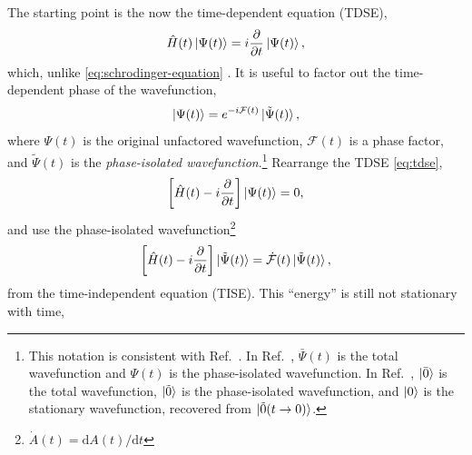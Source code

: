 \documentclass[%
class = book,%
crop = false,%
float = true,%
multi = true,%
preview = false,%
]{standalone}
\begin{document}
The starting point is the now the time-dependent \schrod{} equation (TDSE),
\begin{equation}
  \label{eq:tdse}
  \hat{H}(t) \ket{\Psi(t)} = i\frac{\partial}{\partial t} \ket{\Psi(t)},
\end{equation}
which, unlike \eqref{eq:schrodinger-equation} .  It is useful to factor out the time-dependent phase of the wavefunction,
\begin{equation}
  \label{eq:phase-isolated-wavefunction}
  \ket{\Psi(t)} = e^{-i\mathcal{F}(t)} \ket{\tilde{\Psi}(t)},
\end{equation}
where \(\Psi(t)\) is the original unfactored wavefunction, \(\mathcal{F}(t)\) is a phase factor, and \(\tilde{\Psi}(t)\) is the \emph{phase-isolated wavefunction}.\footnote{This notation is consistent with Ref.~\parencite{gauss2000}. In Ref.~\parencite{Toulouse2015}, \(\bar{\Psi}(t)\) is the total wavefunction and \(\Psi(t)\) is the phase-isolated wavefunction. In Ref.~\parencite{Christiansen1998}, \(\ket{\bar{0}}\) is the total wavefunction, \(\ket{\tilde{0}}\) is the phase-isolated wavefunction, and \(\ket{0}\) is the stationary wavefunction, recovered from \(\ket{\tilde{0}(t \rightarrow 0)}\).} Rearrange the TDSE \eqref{eq:tdse},
\begin{equation}
  \label{eq:tdse-rearranged}
  \left[ \hat{H}(t) - i\frac{\partial}{\partial t} \right] \ket{\Psi(t)} = 0,
\end{equation}
and use the phase-isolated wavefunction\footnote{\(\dot{A}(t) = \mathrm{d}A(t)/\mathrm{d}t\)}
\begin{equation}
  \label{eq:phase-isolated-tdse}
  \left[ \hat{H}(t) - i\frac{\partial}{\partial t} \right] \ket{\tilde{\Psi}(t)} = \dot{\mathcal{F}}(t) \ket{\tilde{\Psi}(t)},
\end{equation}
 from the time-independent \schrod{} equation (TISE). This ``energy'' is still not stationary with time, 
\end{document}
